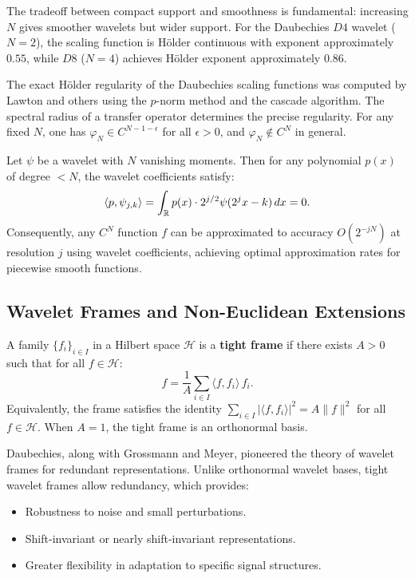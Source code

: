 The tradeoff between compact support and smoothness is fundamental: increasing $N$ gives smoother wavelets but wider support. For the Daubechies $D4$ wavelet ($N = 2$), the scaling function is H\"older continuous with exponent approximately $0.55$, while $D8$ ($N = 4$) achieves H\"older exponent approximately $0.86$.

\begin{remark}
The exact H\"older regularity of the Daubechies scaling functions was computed by Lawton and others using the $p$-norm method and the cascade algorithm. The spectral radius of a transfer operator determines the precise regularity. For any fixed $N$, one has $\varphi_N \in C^{N-1-\epsilon}$ for all $\epsilon > 0$, and $\varphi_N \notin C^{N}$ in general.
\end{remark}

\begin{theorem}
Let $\psi$ be a wavelet with $N$ vanishing moments. Then for any polynomial $p(x)$ of degree $< N$, the wavelet coefficients satisfy:
\[
\langle p, \psi_{j,k} \rangle = \int_{\mathbb{R}} p(x) \cdot 2^{j/2} \psi(2^j x - k) \, dx = 0.
\]
Consequently, any $C^N$ function $f$ can be approximated to accuracy $O(2^{-jN})$ at resolution $j$ using wavelet coefficients, achieving optimal approximation rates for piecewise smooth functions.
\end{theorem}

\subsection{Wavelet Frames and Non-Euclidean Extensions}

\begin{definition}
A family $\{f_i\}_{i \in I}$ in a Hilbert space $\mathcal{H}$ is a \textbf{tight frame} if there exists $A > 0$ such that for all $f \in \mathcal{H}$:
\[
f = \frac{1}{A} \sum_{i \in I} \langle f, f_i \rangle \, f_i.
\]
Equivalently, the frame satisfies the identity $\sum_{i \in I} |\langle f, f_i \rangle|^2 = A \|f\|^2$ for all $f \in \mathcal{H}$. When $A = 1$, the tight frame is an orthonormal basis.
\end{definition}

Daubechies, along with Grossmann and Meyer, pioneered the theory of wavelet frames for redundant representations. Unlike orthonormal wavelet bases, tight wavelet frames allow redundancy, which provides:
\begin{itemize}
    \item Robustness to noise and small perturbations.
    \item Shift-invariant or nearly shift-invariant representations.
    \item Greater flexibility in adaptation to specific signal structures.
\end{itemize}

